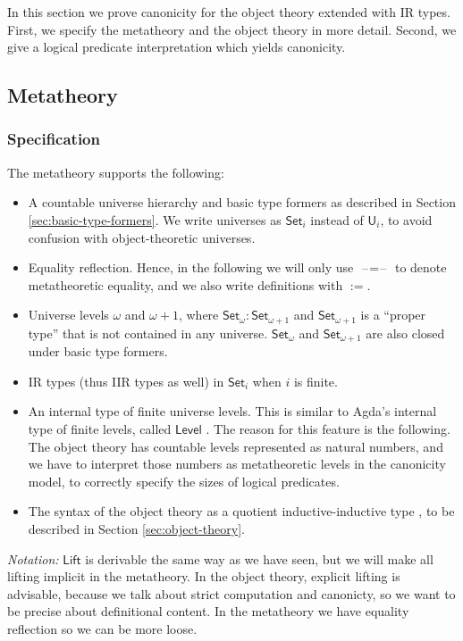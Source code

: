 \documentclass[acmsmall,screen,review,anonymous]{acmart}
\newcommand{\msf}[1]{{\mathsf{#1}}}
\newcommand{\U}{\msf{U}}
\newcommand{\Set}{\msf{Set}}
\newcommand{\Lift}{\msf{Lift}}
\newcommand{\blank}{{\mathord{\hspace{1pt}\text{--}\hspace{1pt}}}}
\newcommand{\Level}{\msf{Level}}
\begin{document}
In this section we prove canonicity for the object theory extended with IR types. First, we specify
the metatheory and the object theory in more detail. Second, we give a logical predicate
interpretation which yields canonicity.

\subsection{Metatheory}\label{sec:metatheory}

\subsubsection{Specification} The metatheory supports the following:
\begin{itemize}
  \item A countable universe hierarchy and basic type formers as described in Section \ref{sec:basic-type-formers}.
    We write universes as $\Set_i$ instead of $\U_i$, to avoid confusion with object-theoretic
    universes.
  \item Equality reflection. Hence, in the following we will only use $\blank\!=\!\blank$ to denote
    metatheoretic equality, and we also write definitions with $:=$.
  \item Universe levels $\omega$ and $\omega+1$, where $\Set_\omega : \Set_{\omega + 1}$ and $\Set_{\omega + 1}$
        is a ``proper type'' that is not contained in any universe. $\Set_\omega$ and $\Set_{\omega + 1}$ are
        also closed under basic type formers.
  \item IR types (thus IIR types as well) in $\Set_i$ when $i$ is finite.
  \item An internal type of finite universe levels. This is similar to Agda's internal type of
    finite levels, called $\Level$ \cite{agdadocs}. The reason for this feature is the following. The
    object theory has countable levels represented as natural numbers, and we have to interpret
    those numbers as metatheoretic levels in the canonicity model, to correctly specify the sizes of
    logical predicates.
  \item The syntax of the object theory as a quotient inductive-inductive type \cite{ttintt,DBLP:journals/corr/abs-2302-08837}, to be
    described in Section \ref{sec:object-theory}.
\end{itemize}
\emph{Notation:} $\Lift$ is derivable the same way as we have seen, but we will make all
lifting implicit in the metatheory. In the object theory, explicit lifting is advisable, because
we talk about strict computation and canonicty, so we want to be precise about definitional
content. In the metatheory we have equality reflection so we can be more loose.
\end{document}

